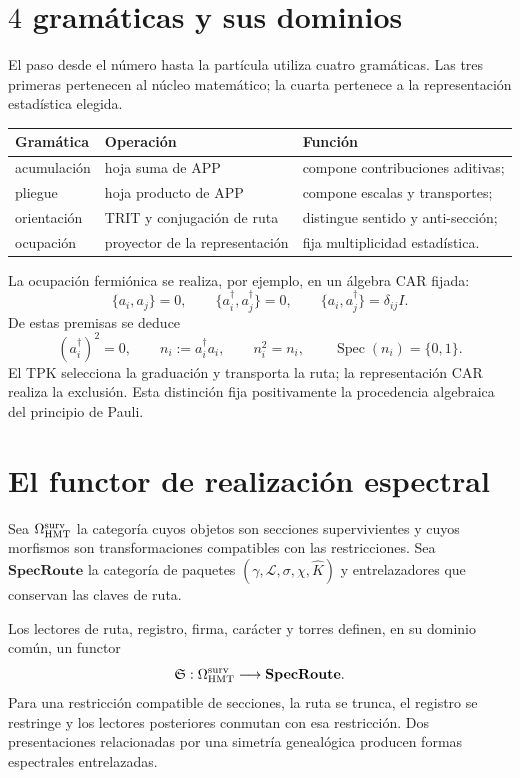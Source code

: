 \section{\(4\) gramáticas y sus dominios}

El paso desde el número hasta la partícula utiliza cuatro gramáticas. Las
tres primeras pertenecen al núcleo matemático; la cuarta pertenece a la
representación estadística elegida.

\begin{center}
\begin{tabular}{@{}lll@{}}
\toprule
\textbf{Gramática} & \textbf{Operación} & \textbf{Función}\\
\midrule
acumulación & hoja suma de APP & compone contribuciones aditivas;\\
pliegue & hoja producto de APP & compone escalas y transportes;\\
orientación & TRIT y conjugación de ruta & distingue sentido y anti-sección;\\
ocupación & proyector de la representación & fija multiplicidad estadística.\\
\bottomrule
\end{tabular}
\end{center}

La ocupación fermiónica se realiza, por ejemplo, en un álgebra CAR fijada:
\[
 \{a_i,a_j\}=0,
 \qquad
 \{a_i^\dagger,a_j^\dagger\}=0,
 \qquad
 \{a_i,a_j^\dagger\}=\delta_{ij}I.
\]
De estas premisas se deduce
\[
 (a_i^\dagger)^2=0,
 \qquad
 n_i:=a_i^\dagger a_i,
 \qquad
 n_i^2=n_i,
 \qquad
 \operatorname{Spec}(n_i)=\{0,1\}.
\]
El TPK selecciona la graduación y transporta la ruta; la representación CAR
realiza la exclusión. Esta distinción fija positivamente la procedencia
algebraica del principio de Pauli.

\section{El functor de realización espectral}

Sea \(\Omega_{\rm HMT}^{\rm surv}\) la categoría cuyos objetos son secciones
supervivientes y cuyos morfismos son transformaciones compatibles con las
restricciones. Sea \(\mathbf{SpecRoute}\) la categoría de paquetes
\((\gamma,\mathcal L,\sigma,\chi,\widehat K)\) y entrelazadores que
conservan las claves de ruta.

\begin{theorem}
\label{thm:functor-realizacion-espectral-numero}
Los lectores de ruta, registro, firma, carácter y torres definen, en su
dominio común, un functor
\[
 \mathfrak S:
 \Omega_{\rm HMT}^{\rm surv}\longrightarrow\mathbf{SpecRoute}.
\]
Para una restricción compatible de secciones, la ruta se trunca, el registro
se restringe y los lectores posteriores conmutan con esa restricción. Dos
presentaciones relacionadas por una simetría genealógica producen formas
espectrales entrelazadas.
\end{theorem}

